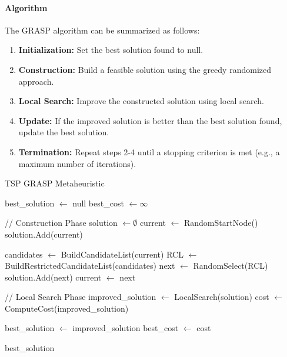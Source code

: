 \documentclass{article}
\begin{document}
\paragraph{Algorithm}
The GRASP algorithm can be summarized as follows:
\begin{enumerate}
	\item \textbf{Initialization:} Set the best solution found to null.
	\item \textbf{Construction:} Build a feasible solution using the greedy randomized approach.
	\item \textbf{Local Search:} Improve the constructed solution using local search.
	\item \textbf{Update:} If the improved solution is better than the best solution found, update the best solution.
	\item \textbf{Termination:} Repeat steps 2-4 until a stopping criterion is met (e.g., a maximum number of iterations).
\end{enumerate}

\newpage
\begin{algorithm}[!ht]
\caption{TSP GRASP Metaheuristic}
\begin{algorithmic}[1]
\State best\_solution $\gets$ null
\State best\_cost $\gets \infty$

	\State // Construction Phase
	\State solution $\gets \emptyset$
	\State current $\gets$ RandomStartNode()
	\State solution.Add(current)
	
		\State candidates $\gets$ BuildCandidateList(current)
		\State RCL $\gets$ BuildRestrictedCandidateList(candidates)
		\State next $\gets$ RandomSelect(RCL)
		\State solution.Add(next)
		\State current $\gets$ next
	\EndWhile
	
	\State // Local Search Phase
	\State improved\_solution $\gets$ LocalSearch(solution)
	\State cost $\gets$ ComputeCost(improved\_solution)
	
		\State best\_solution $\gets$ improved\_solution
		\State best\_cost $\gets$ cost
	\EndIf
\EndFor

\State \Return best\_solution
\EndProcedure
\end{algorithmic}
\end{algorithm}
\end{document}
